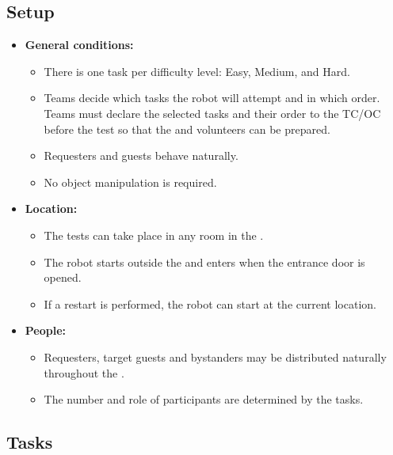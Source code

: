 \subsection*{Setup}
\begin{itemize}
	\item \textbf{General conditions:}
	\begin{itemize}
		\item There is one task per difficulty level: Easy, Medium, and Hard.
		\item Teams decide which tasks the robot will attempt and in which order. Teams must declare the selected tasks and their order to the TC/OC before the test so that the \Arena{} and volunteers can be prepared.
		\item Requesters and guests behave naturally.
		\item No object manipulation is required.
	\end{itemize}
	\item \textbf{Location:}
	\begin{itemize}
		\item The tests can take place in any room in the \Arena{}.
		\item The robot starts outside the \Arena{} and enters when the entrance door is opened.
		\item If a restart is performed, the robot can start at the current location.
	\end{itemize}
	\item \textbf{People:}
	\begin{itemize}
		\item Requesters, target guests and bystanders may be distributed naturally throughout the \Arena{}.
		\item The number and role of participants are determined by the tasks.
	\end{itemize}
\end{itemize}

\subsection*{Tasks}

